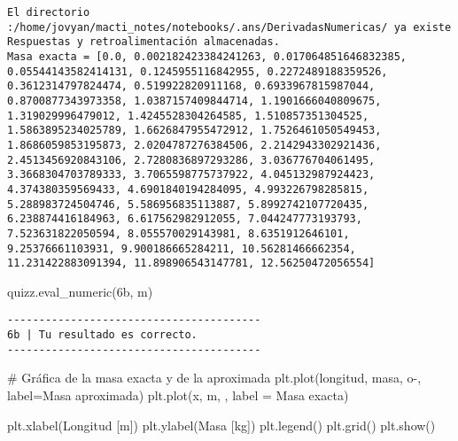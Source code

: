 \documentclass[
  letterpaper,
  DIV=11,
  numbers=noendperiod]{scrreprt}
\newenvironment{Shaded}{\begin{snugshade}}{\end{snugshade}}
\newcommand{\CommentTok}[1]{\textcolor[rgb]{0.37,0.37,0.37}{#1}}
\newcommand{\NormalTok}[1]{\textcolor[rgb]{0.00,0.23,0.31}{#1}}
\newcommand{\OperatorTok}[1]{\textcolor[rgb]{0.37,0.37,0.37}{#1}}
\newcommand{\StringTok}[1]{\textcolor[rgb]{0.13,0.47,0.30}{#1}}
\begin{document}
\begin{verbatim}
El directorio :/home/jovyan/macti_notes/notebooks/.ans/DerivadasNumericas/ ya existe
Respuestas y retroalimentación almacenadas.
Masa exacta = [0.0, 0.002182423384241263, 0.017064851646832385, 0.05544143582414131, 0.1245955116842955, 0.2272489188359526, 0.3612314797824474, 0.519922820911168, 0.6933967815987044, 0.8700877343973358, 1.0387157409844714, 1.1901666040809675, 1.319029996479012, 1.4245528304264585, 1.510857351304525, 1.5863895234025789, 1.6626847955472912, 1.7526461050549453, 1.8686059853195873, 2.0204787276384506, 2.2142943302921436, 2.4513456920843106, 2.7280836897293286, 3.036776704061495, 3.3668304703789333, 3.7065598775737922, 4.045132987924423, 4.374380359569433, 4.6901840194284095, 4.993226798285815, 5.288983724504746, 5.586956835113887, 5.8992742107720435, 6.238874416184963, 6.617562982912055, 7.044247773193793, 7.523631822050594, 8.055570029143981, 8.6351912646101, 9.25376661103931, 9.900186665284211, 10.56281466662354, 11.231422883091394, 11.898906543147781, 12.56250472056554]
\end{verbatim}

\begin{Shaded}
\begin{Highlighting}[]
\NormalTok{quizz.eval\_numeric(}\StringTok{\textquotesingle{}6b\textquotesingle{}}\NormalTok{, m)}
\end{Highlighting}
\end{Shaded}

\begin{verbatim}
----------------------------------------
6b | Tu resultado es correcto.
----------------------------------------
\end{verbatim}

\begin{Shaded}
\begin{Highlighting}[]
\CommentTok{\# Gráfica de la masa exacta y de la aproximada}
\NormalTok{plt.plot(longitud, masa, }\StringTok{\textquotesingle{}o{-}\textquotesingle{}}\NormalTok{, label}\OperatorTok{=}\StringTok{\textquotesingle{}Masa aproximada\textquotesingle{}}\NormalTok{)}
\NormalTok{plt.plot(x, m, }\StringTok{\textquotesingle{}{-}\textquotesingle{}}\NormalTok{, label }\OperatorTok{=} \StringTok{\textquotesingle{}Masa exacta\textquotesingle{}}\NormalTok{)}

\NormalTok{plt.xlabel(}\StringTok{\textquotesingle{}Longitud [m]\textquotesingle{}}\NormalTok{)}
\NormalTok{plt.ylabel(}\StringTok{\textquotesingle{}Masa [kg]\textquotesingle{}}\NormalTok{)}
\NormalTok{plt.legend()}
\NormalTok{plt.grid()}
\NormalTok{plt.show()}
\end{Highlighting}
\end{Shaded}
\end{document}
